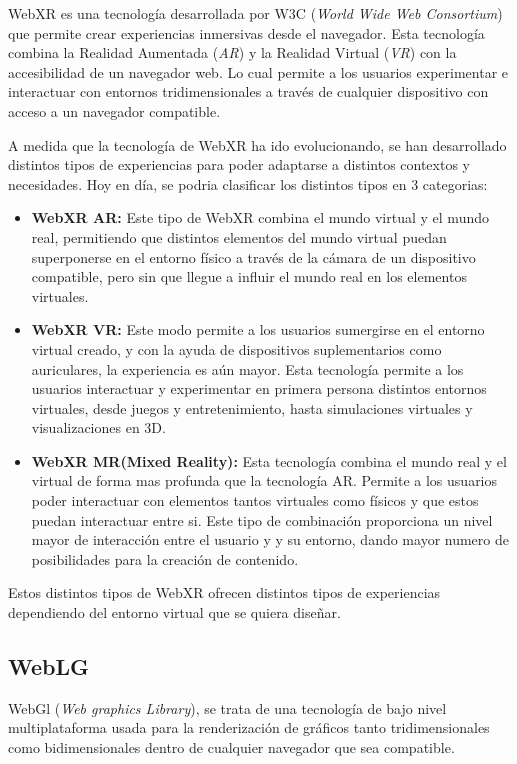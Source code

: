 \documentclass[a4paper, 12pt]{book}
\begin{document}
WebXR \cite{onirix2024} es una tecnología desarrollada por W3C (\textit{World Wide Web Consortium}) que permite crear experiencias inmersivas desde el navegador. Esta tecnología combina la Realidad Aumentada (\textit{AR}) y la Realidad Virtual (\textit{VR}) con la accesibilidad de un navegador web.
Lo cual permite a los usuarios experimentar e interactuar con entornos tridimensionales a través de cualquier dispositivo con acceso a un navegador compatible.

A medida que la tecnología de WebXR ha ido evolucionando, se han desarrollado distintos tipos de experiencias para poder adaptarse a distintos contextos y necesidades. Hoy en día, se podria clasificar los distintos tipos en 3 categorias:
\begin{itemize}
	\item \textbf{WebXR AR:} Este tipo de WebXR combina el mundo virtual y el mundo real, permitiendo que distintos elementos del mundo virtual puedan superponerse en el entorno físico a través
	      de la cámara de un dispositivo compatible, pero sin que llegue a influir el mundo real en los elementos virtuales.
	\item \textbf{WebXR VR:} Este modo permite a los usuarios sumergirse en el entorno virtual creado, y con la ayuda de dispositivos suplementarios como auriculares, la experiencia es aún mayor. Esta tecnología permite a los usuarios
	      interactuar y experimentar en primera persona distintos entornos virtuales, desde juegos y entretenimiento, hasta simulaciones virtuales y visualizaciones en 3D.
	\item \textbf{WebXR MR(Mixed Reality):} Esta tecnología combina el mundo real y el virtual de forma mas profunda que la tecnología AR. Permite a los usuarios poder interactuar con elementos tantos virtuales como físicos y que estos puedan interactuar entre si. Este tipo de combinación proporciona un nivel mayor de interacción entre el usuario y
	      y su entorno, dando mayor numero de posibilidades para la creación de contenido.
\end{itemize}

Estos distintos tipos de WebXR ofrecen distintos tipos de experiencias dependiendo del entorno virtual que se quiera diseñar.

\subsection{WebLG}
\label{subsec:WebLG}
WebGl (\textit{Web graphics Library}), se trata de una tecnología de bajo nivel multiplataforma usada para la renderización de gráficos tanto tridimensionales como bidimensionales dentro de cualquier navegador que sea compatible.
\end{document}
